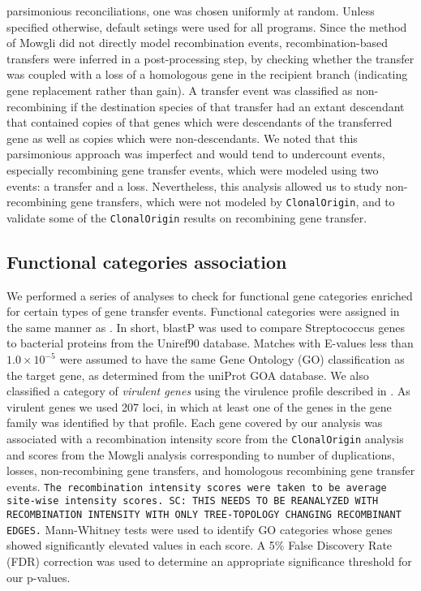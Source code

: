 \documentclass[english]{article}
\begin{document}
parsimonious reconciliations, one was chosen uniformly at random.  Unless
specified otherwise, default setings were used for all programs.  Since the
method of Mowgli did not directly model recombination events,
recombination-based transfers were inferred in a post-processing step, by
checking whether the transfer was coupled with a loss of a homologous gene in
the recipient branch (indicating gene replacement rather than gain).  A transfer
event was classified as non-recombining if the destination species of that
transfer had an extant descendant that contained copies of that genes which were
descendants of the transferred gene as well as copies which were
non-descendants.  We noted that this parsimonious approach was imperfect and
would tend to undercount events, especially recombining gene transfer events,
which were modeled using two events: a transfer and a loss. Nevertheless, this
analysis allowed us to study non-recombining gene transfers, which were not
modeled by \texttt{ClonalOrigin}, and to validate some of the
\texttt{ClonalOrigin} results on recombining gene transfer.  

\subsection{Functional categories association}
We performed a series of analyses to check for functional gene categories
enriched for certain types of gene transfer events. Functional categories were
assigned in the same manner as \citet{Suzuki2011}. In short, blastP was used to
compare Streptococcus genes to bacterial proteins from the Uniref90 database.
Matches with E-values less than $1.0\times10^{-5}$ were assumed to have the same
Gene Ontology (GO) classification as the target gene, as determined from the
uniProt GOA database.  We also classified a category of  \textit{virulent genes}
using the virulence profile described in \citet{Suzuki2011}. As virulent genes
we used 207 loci, in which at least one of the genes in the gene family was
identified by that profile.  Each gene covered by our analysis was associated
with a recombination intensity score from the \texttt{ClonalOrigin} analysis and
scores from the Mowgli analysis corresponding to number of duplications, losses,
non-recombining gene transfers, and homologous recombining gene transfer events.
\texttt{The recombination intensity scores were taken to be average site-wise
intensity scores. SC: THIS NEEDS TO BE REANALYZED WITH RECOMBINATION INTENSITY
WITH ONLY TREE-TOPOLOGY CHANGING RECOMBINANT EDGES.} Mann-Whitney tests were
used to identify GO categories whose genes showed significantly elevated values
in each score.  A 5\% False Discovery Rate (FDR) correction
\citep{Benjamini1995} was used to determine an appropriate significance
threshold for our p-values.
\end{document}
